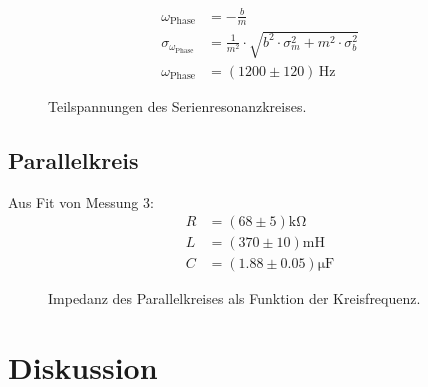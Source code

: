 \documentclass[12pt,a4paper,titlepage,headinclude,bibtotoc]{scrartcl}
\begin{document}
\begin{align}
\omega_\text{Phase}&=- \frac{b}{m}\\
\sigma_{\omega_\text{Phase}}&=\frac{1}{m^{2}} \cdot \sqrt{b^{2} \cdot \sigma_{m}^{2} + m^{2} \cdot \sigma_{b}^{2}}\\
\omega_\text{Phase}&=(1200 \pm 120)\,\si\hertz
\end{align}
\begin{figure}[!htb]
	\centering
	
	\caption{Teilspannungen des Serienresonanzkreises.}
	\label{fig:teilU}
\end{figure}
\subsection{Parallelkreis}
Aus Fit von Messung 3:
\begin{align}
R &= (68\pm 5)\si{\kilo\ohm}\\
L &= (370 \pm 10)\si{\milli\henry}\\
C &= (1.88  \pm 0.05) \si{\micro\farad}
\end{align}
\begin{figure}[!htb]
	\centering
	
	\caption{Impedanz des Parallelkreises als Funktion der Kreisfrequenz.}
	\label{fig:messung3}
\end{figure}

\section{Diskussion}
\label{sec:diskussion}



\end{document}
